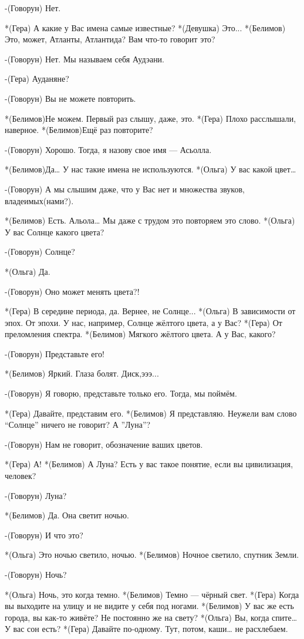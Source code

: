 -(Говорун) Нет.

*(Гера) А какие у Вас имена самые известные?
*(Девушка) Это...
*(Белимов) Это, может, Атланты, Атлантида?  Вам что-то говорит это?

-(Говорун) Нет. Мы называем себя Аудэани. 

-(Гера) Ауданяне?

-(Говорун) Вы не можете повторить.

*(Белимов)Не можем. Первый раз слышу, даже, это.
*(Гера) Плохо расслышали,  наверное.
*(Белимов)Ещё раз повторите?

-(Говорун) Хорошо. Тогда, я назову свое имя — Асьолла.


*(Белимов)Да… У нас такие имена не используются.
*(Ольга) У вас какой цвет…

-(Говорун) А мы слышим даже, что у Вас нет  и множества звуков, владеимых(нами?).

*(Белимов) Есть. Альола…  Мы даже с трудом это повторяем это слово.
*(Ольга) У вас Солнце какого цвета?

-(Говорун) Солнце?

*(Ольга) Да.

-(Говорун) Оно может менять цвета?!

*(Гера) В середине периода, да. Вернее, не Солнце...
*(Ольга) В зависимости от эпох. От эпохи. У нас, например, Солнце жёлтого цвета, а у Вас?
*(Гера) От преломления спектра.
*(Белимов) Мягкого жёлтого цвета. А у Вас, какого?

-(Говорун) Представьте его!

*(Белимов) Яркий. Глаза болят. Диск,эээ...

-(Говорун) Я говорю, представьте только его. Тогда, мы поймём.

*(Гера) Давайте, представим его.
*(Белимов) Я представляю. Неужели вам слово “Солнце” ничего не говорит? А ”Луна”?

-(Говорун) Нам не говорит, обозначение ваших цветов.

*(Гера) А!
*(Белимов) А Луна? Есть у вас такое понятие, если вы цивилизация, человек?

-(Говорун) Луна?

*(Белимов) Да. Она светит ночью.

-(Говорун) И что это?

*(Ольга) Это ночью светило, ночью.
*(Белимов) Ночное светило, спутник Земли.

-(Говорун) Ночь?

*(Ольга) Ночь, это когда темно.
*(Белимов) Темно — чёрный свет.
*(Гера) Когда вы выходите на улицу и не видите у себя под ногами.
*(Белимов) У вас же есть города,  вы  как-то живёте? Не постоянно же на свету?
*(Ольга) Вы, когда спите… У вас сон есть?
*(Гера) Давайте по-одному. Тут, потом, каши… не расхлебаем.


